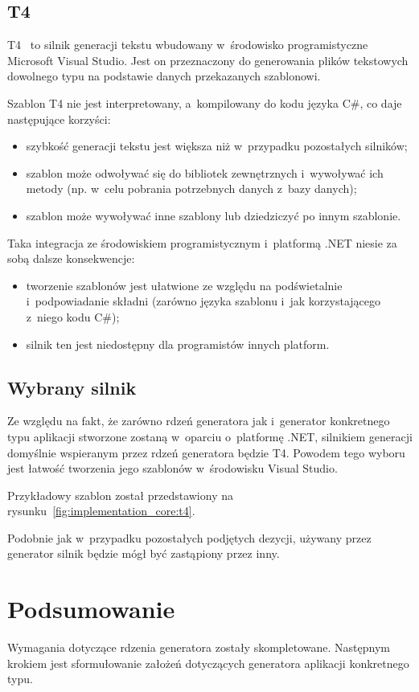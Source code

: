\subsection{T4}

T4~\cite{t4} to silnik generacji tekstu wbudowany w~środowisko programistyczne Microsoft Visual Studio.
Jest on przeznaczony do generowania plików tekstowych dowolnego typu na podstawie danych przekazanych szablonowi.

Szablon T4 nie jest interpretowany, a~kompilowany do kodu języka C\#, co daje następujące korzyści:

\begin{itemize}
 \item szybkość generacji tekstu jest większa niż w~przypadku pozostałych silników;
 \item szablon może odwoływać się do bibliotek zewnętrznych i~wywoływać ich metody (np. w~celu pobrania potrzebnych danych z~bazy danych);
 \item szablon może wywoływać inne szablony lub dziedziczyć po innym szablonie.
\end{itemize}

Taka integracja ze środowiskiem programistycznym i~platformą .NET niesie za sobą dalsze konsekwencje:

\begin{itemize}
 \item tworzenie szablonów jest ułatwione ze względu na podświetalnie i~podpowiadanie składni (zarówno języka szablonu i~jak korzystającego z~niego kodu C\#);
 \item silnik ten jest niedostępny dla programistów innych platform.
\end{itemize}


\subsection{Wybrany silnik}

Ze względu na fakt, że zarówno rdzeń generatora jak i~generator konkretnego typu aplikacji stworzone zostaną w~oparciu o~platformę .NET, silnikiem generacji domyślnie wspieranym przez rdzeń generatora będzie T4.
Powodem tego wyboru jest łatwość tworzenia jego szablonów w~środowisku Visual Studio.

Przykładowy szablon został przedstawiony na rysunku~\ref{fig:implementation_core:t4}.



Podobnie jak w~przypadku pozostałych podjętych dezycji, używany przez generator silnik będzie mógł być zastąpiony przez inny.



\section{Podsumowanie}

Wymagania dotyczące rdzenia generatora zostały skompletowane.
Następnym krokiem jest sformułowanie założeń dotyczących generatora aplikacji konkretnego typu.
